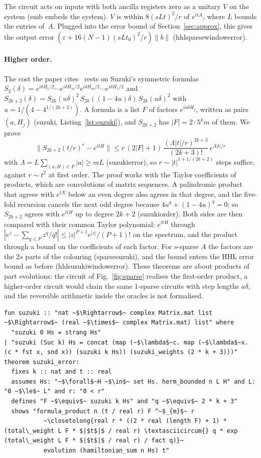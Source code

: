 \documentclass[runningheads]{llncs}
\newcommand{\norm}[1]{\|#1\|}
\newcommand{\closetolong}[1]{$\approx_{\parbox[t]{0.62\linewidth}{\raggedright\scriptsize\ttfamily #1}}$}
\DeclareRobustCommand{\isa}[1]{\textsf{\def\_{\char95\allowbreak}#1}}
\begin{document}
The circuit acts on inputs with both ancilla registers zero as a unitary $V$ on the system
(\isa{emb} embeds the system). $V$ is within $8(sLt)^2/r$ of $e^{itA}$, where $L$ bounds the entries of~$A$.
Plugged into the error bound of Section~\ref{sec:approx}, this gives the output error
$(\varepsilon+16(N-1)(sLt_0)^2/r)\norm b$ (\isa{hhl\_sparse\_window\_error}).

\paragraph{Higher order.} The cost the paper cites~\cite{berry2007} rests on Suzuki's symmetric
formulas $S_2(\delta)=e^{i\delta H_1/2}\cdots e^{i\delta H_m/2}e^{i\delta H_m/2}\cdots e^{i\delta H_1/2}$ and
$S_{2k+2}(\delta)=S_{2k}(u\delta)^2\,S_{2k}((1-4u)\delta)\,S_{2k}(u\delta)^2$ with $u=1/(4-4^{1/(2k+3)})$.
A formula is a list $F$ of factors $e^{ia\delta H_j}$, written as pairs $(a,H_j)$ (\isa{suzuki},
Listing~\ref{lst:suzuki}), and $S_{2k+2}$ has $|F|=2\cdot5^km$ of them. We prove
\[
\bigl\|S_{2k+2}(t/r)^r-e^{itH}\bigr\|\le r\,(2|F|+1)\,\frac{(\Lambda|t|/r)^{2k+3}}{(2k+3)!}\,e^{\Lambda|t|/r}
\]
with $\Lambda=L\sum_{(a,H)\in F}|a|\ge mL$ (\isa{suzuki\_error}), so $r\sim|t|^{1+1/(2k+2)}$ steps suffice, against $r\sim t^2$ at first order.
The proof works with the Taylor coefficients of products, which are convolutions of matrix sequences.
A palindromic product that agrees with $e^{tX}$ below an even degree also agrees in that degree, and
the five-fold recursion cancels the next odd degree because $4u^q+(1-4u)^q=0$; so $S_{2k+2}$ agrees
with $e^{itH}$ up to degree $2k+2$ (\isa{suzuki\_order}). Both sides are then compared with their
common Taylor polynomial: $e^{itH}$ through $|e^z-\sum_{q\le P}z^q/q!|\le|z|^{P+1}e^{|z|}/(P+1)!$ on
the spectrum, and the product through a bound on the coefficients of each factor. For $s$-sparse $A$
the factors are the $2s$ parts of the colouring (\isa{sparse\_suzuki}), and the bound enters the HHL
error bound as before (\isa{hhl\_suzuki\_window\_error}). These theorems are about products of part
evolutions: the circuit of Fig.~\ref{fig:sparse} realises the first-order product, a higher-order
circuit would chain the same 1-sparse circuits with step lengths $a\delta$, and the reversible
arithmetic inside the oracles is not formalised.

\begin{lstlisting}[float=tp,caption={Suzuki's formulas and their error},label={lst:suzuki}]
fun suzuki :: "nat ~$\Rightarrow$~ complex Matrix.mat list ~$\Rightarrow$~ (real ~$\times$~ complex Matrix.mat) list" where
  "suzuki 0 Hs = strang Hs"
| "suzuki (Suc k) Hs = concat (map (~$\lambda$~c. map (~$\lambda$~x. (c * fst x, snd x)) (suzuki k Hs)) (suzuki_weights (2 * k + 3)))"
theorem suzuki_error:
  fixes k :: nat and t :: real
  assumes Hs: "~$\forall$~H ~$\in$~ set Hs. herm_bounded n L H" and L: "0 ~$\le$~ L" and r: "0 < r"
  defines "F ~$\equiv$~ suzuki k Hs" and "q ~$\equiv$~ 2 * k + 3"
  shows "formula_product n (t / real r) F ^~$_{m}$~ r
           ~\closetolong{real r * ((2 * real (length F) + 1) * (total\_weight L F * $|$t$|$ / real r) \textasciicircum{} q * exp (total\_weight L F * $|$t$|$ / real r) / fact q)}~
           evolution (hamiltonian_sum n Hs) t"
\end{lstlisting}
\end{document}
